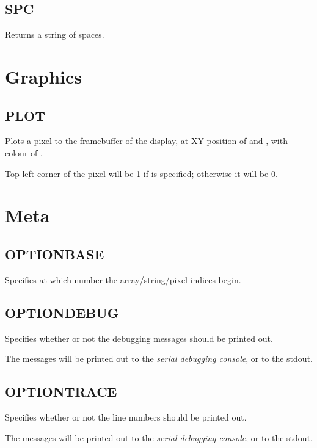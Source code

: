     \subsection{SPC}
        \par
        Returns a string of  spaces.
\section{Graphics}

    \subsection{PLOT}
        \par
        Plots a pixel to the framebuffer of the display, at XY-position of  and , with colour of .\par
        Top-left corner of the pixel will be 1 if  is specified; otherwise it will be 0.

\section{Meta}

    \subsection{OPTIONBASE}
        \par
        Specifies at which number the array/string/pixel indices begin.
    \subsection{OPTIONDEBUG}
        \par
        Specifies whether or not the debugging messages should be printed out.\par
        The messages will be printed out to the \emph{serial debugging console}, or to the stdout.
    \subsection{OPTIONTRACE}
        \par
        Specifies whether or not the line numbers should be printed out.\par
        The messages will be printed out to the \emph{serial debugging console}, or to the stdout.

